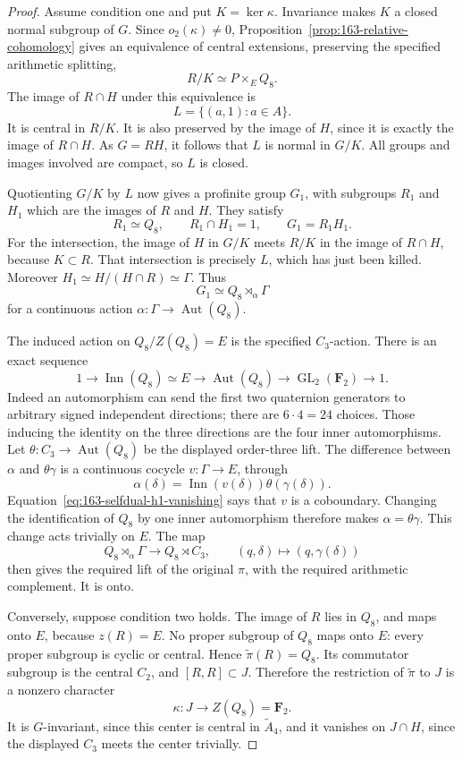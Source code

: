 \begin{proof}
Assume condition one and put \(K=\ker\kappa\).  Invariance makes
\(K\) a closed normal subgroup of \(G\).  Since
\(o_2(\kappa)\ne0\), Proposition~\ref{prop:163-relative-cohomology}
gives an equivalence of central extensions, preserving the specified
arithmetic splitting,
\[
 R/K\simeq P\times_E Q_8.
\]
The image of \(R\cap H\) under this equivalence is
\[
 L=\{(a,1):a\in A\}.
\]
It is central in \(R/K\).  It is also preserved by the image of
\(H\), since it is exactly the image of \(R\cap H\).
As \(G=RH\), it follows that \(L\) is normal in \(G/K\).
All groups and images involved are compact, so \(L\) is closed.

Quotienting \(G/K\) by \(L\) now gives a profinite group
\(G_1\), with subgroups \(R_1\) and \(H_1\) which are the
images of \(R\) and \(H\).  They satisfy
\[
 R_1\simeq Q_8,\qquad R_1\cap H_1=1,\qquad G_1=R_1H_1.
\]
For the intersection, the image of \(H\) in \(G/K\) meets
\(R/K\) in the image of \(R\cap H\), because \(K\subset R\).
That intersection is precisely \(L\), which has just been killed.
Moreover \(H_1\simeq H/(H\cap R)\simeq\Gamma\).  Thus
\[
 G_1\simeq Q_8\rtimes_\alpha\Gamma
\]
for a continuous action \(\alpha:\Gamma\to\operatorname{Aut}(Q_8)\).

The induced action on \(Q_8/Z(Q_8)=E\) is the specified
\(C_3\)-action.  There is an exact sequence
\[
 1\longrightarrow\operatorname{Inn}(Q_8)\simeq E
 \longrightarrow\operatorname{Aut}(Q_8)
 \longrightarrow\operatorname{GL}_2(\mathbf F_2)
 \longrightarrow1.
\]
Indeed an automorphism can send the first two quaternion generators
to arbitrary signed independent directions; there are \(6\cdot4=24\)
choices.  Those inducing the identity on the three directions are
the four inner automorphisms.  Let
\(\theta:C_3\to\operatorname{Aut}(Q_8)\) be the displayed
order-three lift.  The difference between \(\alpha\) and
\(\theta\gamma\) is a continuous cocycle
\(v:\Gamma\to E\), through
\[
 \alpha(\delta)=\operatorname{Inn}(v(\delta))
                         \theta(\gamma(\delta)).
\]
Equation~\eqref{eq:163-selfdual-h1-vanishing} says that \(v\) is a coboundary.  Changing the
identification of \(Q_8\) by one inner automorphism therefore makes
\(\alpha=\theta\gamma\).  This change acts trivially on \(E\).
The map
\[
 Q_8\rtimes_\alpha\Gamma\longrightarrow Q_8\rtimes C_3,
 \qquad(q,\delta)\longmapsto(q,\gamma(\delta))
\]
then gives the required lift of the original \(\pi\), with
the required arithmetic complement.  It is onto.

Conversely, suppose condition two holds.  The image of \(R\)
lies in \(Q_8\), and maps onto \(E\), because \(z(R)=E\).
No proper subgroup of \(Q_8\) maps onto \(E\): every proper
subgroup is cyclic or central.  Hence
\(\widetilde\pi(R)=Q_8\).  Its commutator subgroup is the
central \(C_2\), and \([R,R]\subset J\).  Therefore the
restriction of \(\widetilde\pi\) to \(J\) is a nonzero
character
\[
 \kappa:J\longrightarrow Z(Q_8)=\mathbf F_2.
\]
It is \(G\)-invariant, since this center is central in
\(\widetilde A_4\), and it vanishes on \(J\cap H\), since
the displayed \(C_3\) meets the center trivially.


\end{proof}
